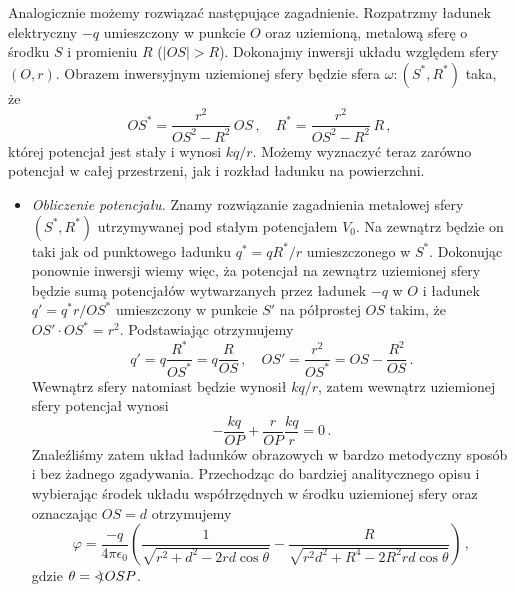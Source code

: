 \documentclass[../main.tex]{subfiles}
\begin{document}
\begin{enumerate}
    Analogicznie możemy rozwiązać następujące zagadnienie. Rozpatrzmy ładunek elektryczny \(-q\)
    umieszczony w punkcie \(O\) oraz uziemioną, metalową sferę o środku \(S\) i promieniu \(R\)
    (\(|OS|>R\)). Dokonajmy inwersji układu względem sfery \((O,r)\). Obrazem inwersyjnym uziemionej
    sfery będzie sfera \(\omega:(S^*,R^*)\) taka, że
    \begin{equation*}
        OS^*=\frac{r^2}{OS^2-R^2}\,OS\,,\quad R^*=\frac{r^2}{OS^2-R^2}\,R\,,
    \end{equation*}
    której potencjał jest stały i wynosi \(kq/r\). Możemy wyznaczyć teraz zarówno potencjał w całej
    przestrzeni, jak i rozkład ładunku na powierzchni.
    \begin{itemize}
        \item \textit{Obliczenie potencjału.} Znamy rozwiązanie zagadnienia metalowej sfery
        \((S^*,R^*)\) utrzymywanej pod stałym potencjałem \(V_0\). Na zewnątrz będzie on taki jak od
        punktowego ładunku \(q^*=qR^*/r\) umieszczonego w \(S^*\). Dokonując ponownie inwersji wiemy
        więc, ża potencjał na zewnątrz uziemionej sfery będzie sumą potencjałów wytwarzanych przez
        ładunek \(-q\) w \(O\) i ładunek \(q'=q^*r/OS^*\) umieszczony w punkcie \(S'\) na półprostej
        \(OS\) takim, że \(OS'\cdot OS^*=r^2\). Podstawiając otrzymujemy
        \begin{equation*}
            q'=q\frac{R^*}{OS^*}=q\frac{R}{OS}\,,\quad OS'=\frac{r^2}{OS^*}=OS-\frac{R^2}{OS}\,.
        \end{equation*}
        Wewnątrz sfery natomiast będzie wynosił \(kq/r\), zatem wewnątrz uziemionej sfery potencjał
        wynosi
        \begin{equation*}
            -\frac{kq}{OP}+\frac{r}{OP}\frac{kq}{r}=0\,.
        \end{equation*}
        Znaleźliśmy zatem układ ładunków obrazowych w bardzo metodyczny sposób i bez żadnego
        zgadywania. Przechodząc do bardziej analitycznego opisu i wybierając środek układu
        współrzędnych w środku uziemionej sfery oraz oznaczając \(OS=d\) otrzymujemy
        \begin{equation*}
            \varphi=\frac{-q}{4\pi\epsilon_0}\left(\frac{1}{\sqrt{r^2+d^2-2rd\cos\theta}}-\frac{R}{\sqrt{r^2d^2+R^4-2R^2rd\cos\theta}}\right)\,,
        \end{equation*}
        gdzie \(\theta=\mathord{<\mspace{-9mu}\mathrel{)}\mspace{2mu}} OSP\).
        

\end{itemize}
\end{enumerate}
\end{document}
